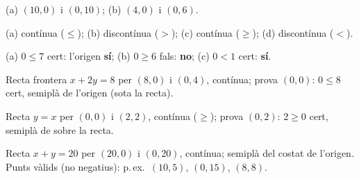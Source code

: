 \begin{solucions}
\begin{sollist}
  \item (a) $(10,0)$ i $(0,10)$; \quad (b) $(4,0)$ i $(0,6)$.
  \item (a) contínua ($\le$); \quad (b) discontínua ($>$); \quad
        (c) contínua ($\ge$); \quad (d) discontínua ($<$).
  \item (a) $0\le 7$ cert: l'origen \textbf{sí}; \quad (b) $0\ge 6$ fals: \textbf{no};
        \quad (c) $0<1$ cert: \textbf{sí}.
  \item Recta frontera $x+2y=8$ per $(8,0)$ i $(0,4)$, contínua; prova $(0,0)$:
        $0\le 8$ cert, semiplà de l'origen (sota la recta).
  \item Recta $y=x$ per $(0,0)$ i $(2,2)$, contínua ($\ge$); prova $(0,2)$:
        $2\ge 0$ cert, semiplà de sobre la recta.
  \item Recta $x+y=20$ per $(20,0)$ i $(0,20)$, contínua; semiplà del costat de
        l'origen. Punts vàlids (no negatius): p.\,ex.\ $(10,5)$, $(0,15)$, $(8,8)$.
\end{sollist}
\end{solucions}
